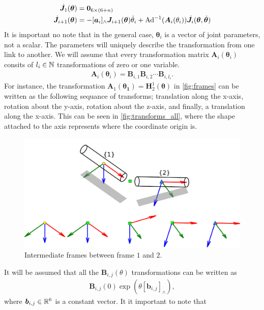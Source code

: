 \begin{align}
    \dot{\bm{J}}_1(\bm{\theta}) &= \bm{0}_{6\times(6+n)} \\
    \dot{\bm{J}}_{i+1}(\bm{\theta}) &= -[\bm{a}_i]_{\wedge}\bm{J}_{i+1}(\bm{\theta})\dot{\theta}_i +
        \operatorname{Ad}^{-1}(\bm{A}_i(\theta_i))\dot{\bm{J}}_i(\bm{\theta},\dot{\bm{\theta}})
\end{align}
It is important no note that in the general case, $\bm{\theta}_i$ is a vector of
joint parameters, not a scalar. The parameters will uniquely describe the transformation from one link
to another. We will assume that every transformation matrix $\bm{A}_i(\bm{\theta}_i)$ consits of $l_i \in \mathbb{N}$ transformations
of zero or one variable.
\begin{align}
    \bm{A}_i(\bm{\theta}_i) = \bm{B}_{i,1} \bm{B}_{i,2} \cdots \bm{B}_{i,l_i}.
\end{align}
For instance, the transformation $\bm{A}_1(\bm{\bm{\theta}_1}) = \bm{H}_2^1(\bm{\theta})$
in \autoref{fig:frames} can be written as the following sequance of transforms;
translation along the x-axis, rotation about the y-axis, rotation about the z-axis, and finally,
a translation along the x-axis. This can be seen in \autoref{fig:transforms_all}, where the shape
attached to the axis represents where the coordinate origin is.
\begin{figure}[h!]
    \centering
    \includegraphics[width=\textwidth]{assets/transforms_all.pdf}
    \caption{Intermediate frames between frame $1$ and $2$.}
    \label{fig:transforms_all}
\end{figure}
It will be assumed that all the $\bm{B}_{i,j}(\theta)$ transformations can be written as
\begin{align}
    \bm{B}_{i,j}(0)\exp\left(\theta[\bm{b}_{i,j}]_{\wedge}\right),
\end{align}
where $\bm{b}_{i,j} \in \mathbb{R}^6$ is a constant vector. It it important to note that
